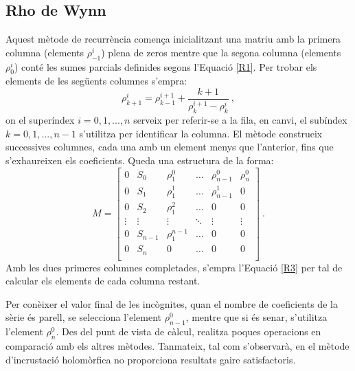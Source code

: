 \subsection{Rho de Wynn}
Aquest mètode de recurrència comença inicialitzant una matriu amb la primera columna (elements $\rho^i_{-1}$) plena de zeros mentre que la segona columna (elements $\rho^i_{0}$) conté les sumes parcials definides segons l'Equació \ref{R1}. 
Per trobar els elements de les següents columnes s'empra:
\begin{equation}
\rho^i_{k+1} = \rho^{i+1}_{k-1}+\frac{k+1}{\rho^{i+1}_k-\rho^{i}_k}\ ,
\label{R3}
\end{equation}
on el superíndex $i=0,1,..., n$ serveix per referir-se a la fila, en canvi, el subíndex $k=0,1,...,n-1$ s'utilitza per identificar la columna. El mètode construeix successives columnes, cada una amb un element menys que l'anterior, fins que s'exhaureixen els coeficients. Queda una estructura de la forma:    
\begin{equation}
M=
\begin{bmatrix}
0 & S_0 & \rho^0_{1} & \dots & \rho^0_{n-1} & \rho^0_{n}\\
0 & S_1 & \rho^1_{1} & \dots & \rho^1_{n-1}& 0\\
0 & S_2 & \rho^2_{1} & \dots & 0& 0\\
\vdots &\vdots & \vdots & \ddots & \vdots & \vdots \\
0 & S_{n-1} & \rho^{n-1}_1 & \dots & 0 & 0\\
0 & S_n & 0 & \dots & 0 &0\\
\end{bmatrix}\ .
\label{R4}
\end{equation}
Amb les dues primeres columnes completades, s'empra l'Equació \ref{R3} per tal de calcular els elements de cada columna restant. 

Per conèixer el valor final de les incògnites, quan el nombre de coeficients de la sèrie és parell, se selecciona l'element $\rho^0_{n-1}$, mentre que si és senar, s'utilitza l'element $\rho^0_n$. Des del punt de vista de càlcul, realitza poques operacions en comparació amb els altres mètodes. Tanmateix, tal com s'observarà, en el mètode d'incrustació holomòrfica no proporciona resultats gaire satisfactoris.


